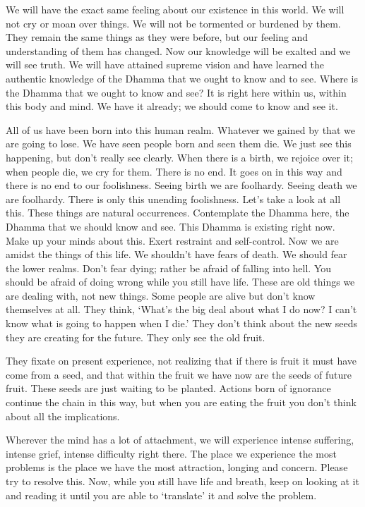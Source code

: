 We will have the exact same feeling about our existence in this world. We will not cry or moan over things. We will not be tormented or burdened by them. They remain the same things as they were before, but our feeling and understanding of them has changed. Now our knowledge will be exalted and we will see truth. We will have attained supreme vision and have learned the authentic knowledge of the Dhamma that we ought to know and to see. Where is the Dhamma that we ought to know and see? It is right here within us, within this body and mind. We have it already; we should come to know and see it.

All of us have been born into this human realm. Whatever we gained by that we are going to lose. We have seen people born and seen them die. We just see this happening, but don't really see clearly. When there is a birth, we rejoice over it; when people die, we cry for them. There is no end. It goes on in this way and there is no end to our foolishness. Seeing birth we are foolhardy. Seeing death we are foolhardy. There is only this unending foolishness. Let's take a look at all this. These things are natural occurrences. Contemplate the Dhamma here, the Dhamma that we should know and see. This Dhamma is existing right now. Make up your minds about this. Exert restraint and self-control. Now we are amidst the things of this life. We shouldn't have fears of death. We should fear the lower realms. Don't fear dying; rather be afraid of falling into hell. You should be afraid of doing wrong while you still have life. These are old things we are dealing with, not new things. Some people are alive but don't know themselves at all. They think, `What's the big deal about what I do now? I can't know what is going to happen when I die.' They don't think about the new seeds they are creating for the future. They only see the old fruit.

They fixate on present experience, not realizing that if there is fruit it must have come from a seed, and that within the fruit we have now are the seeds of future fruit. These seeds are just waiting to be planted. Actions born of ignorance continue the chain in this way, but when you are eating the fruit you don't think about all the implications.

Wherever the mind has a lot of attachment, we will experience intense suffering, intense grief, intense difficulty right there. The place we experience the most problems is the place we have the most attraction, longing and concern. Please try to resolve this. Now, while you still have life and breath, keep on looking at it and reading it until you are able to `translate' it and solve the problem.

